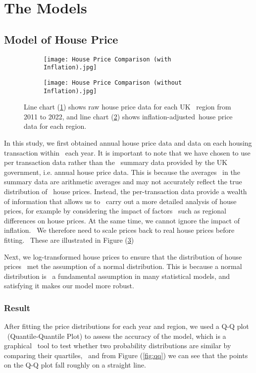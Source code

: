\documentclass[12pt]{article}  %
\begin{document}
\section{The Models}
\subsection{Model of House Price}

\begin{figure}[htbp]
    \centering
    \begin{subfigure}[b]{.45\textwidth}
    \texttt{[image: House Price Comparison (with Inflation).jpg]}
    \caption{}\label{subfig:Inflation}
\end{subfigure}
\begin{subfigure}[b]{.45\textwidth}
    \texttt{[image: House Price Comparison (without Inflation).jpg]}
    \caption{}\label{subfig:noInflation}
\end{subfigure}
\caption{Line chart (\ref{subfig:Inflation}) shows raw house price data for each UK \
region from 2011 to 2022, and line chart (\ref{subfig:noInflation}) shows inflation-adjusted\
house price data for each region.}\label{fig:houseprice}
\end{figure}
In this study, we first obtained annual house price data and data on each housing transaction within \
each year. It is important to note that we have chosen to use per transaction data rather than the \
summary data provided by the UK government, i.e. annual house price data. This is because the averages \
in the summary data are arithmetic averages and may not accurately reflect the true distribution of \
house prices. Instead, the per-transaction data provide a wealth of information that allows us to \
carry out a more detailed analysis of house prices, for example by considering the impact of factors \
such as regional differences on house prices. At the same time, we cannot ignore the impact of inflation. \
We therefore need to scale prices back to real house prices before fitting. \
These are illustrated in Figure (\ref{fig:houseprice})

Next, we log-transformed house prices to ensure that the distribution of house prices \
met the assumption of a normal distribution. This is because a normal distribution is \
a fundamental assumption in many statistical models, and satisfying it makes our model more robust.
\subsubsection{Result}
After fitting the price distributions for each year and region, we used a Q-Q plot \
(Quantile-Quantile Plot) to assess the accuracy of the model, which is a graphical \
tool to test whether two probability distributions are similar by comparing their quartiles, \
and from Figure (\ref{fig:qq}) we can see that the points on the Q-Q plot fall roughly on a straight line.
\end{document}
